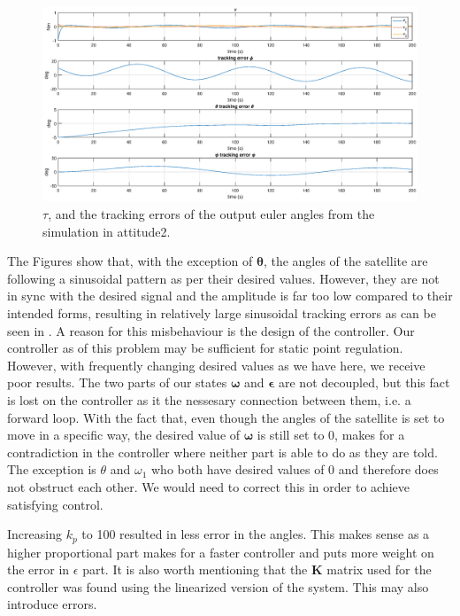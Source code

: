 \begin{figure}[htb]
	\centering
	\includegraphics[width=1.00\textwidth]{figures/2_tau_track.eps}
	\caption{ $\tau$, and the tracking errors of the output euler angles from the simulation in attitude2.}
\label{fig:sim_attitude2_track}
\end{figure}


The Figures show that, with the exception of $\boldsymbol{\theta}$, the angles of the satellite are following a sinusoidal pattern as per their desired values. However, they are not in sync with the desired signal and the amplitude is far too low compared to their intended forms, resulting in relatively large sinusoidal tracking errors as can be seen in . A reason for this misbehaviour is the design of the controller. Our controller as of this problem may be sufficient for static point regulation. However, with frequently changing desired values as we have here, we receive poor results. The two parts of our states $\boldsymbol{\omega}$ and $\boldsymbol{\epsilon}$ are not decoupled, but this fact is lost on the controller as it the nessesary connection between them, i.e. a forward loop. With the fact that, even though the angles of the satellite is set to move in a specific way, the desired value of $\boldsymbol{\omega}$ is still set to 0, makes for a contradiction in the controller where neither part is able to do as they are told. The exception is $\theta$ and $\omega_1$ who both have desired values of 0 and therefore does not obstruct each other. We would need to correct this in order to achieve satisfying control.

Increasing $k_p$ to 100 resulted in less error in the angles. This makes sense as a higher proportional part makes for a faster controller and puts more weight on the error in $\epsilon$ part. It is also worth mentioning that the $\mathbf{K}$ matrix used for the controller was found using the linearized version of the system. This may also introduce errors.

